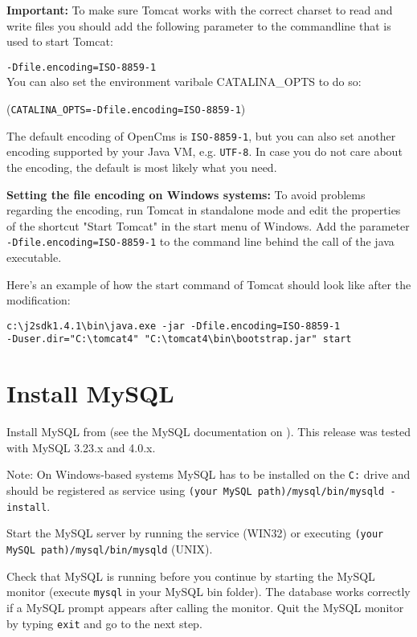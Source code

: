 \textbf{Important:} To make sure Tomcat works with the correct charset to read and
write files you should add the following parameter to the
commandline that is used to start Tomcat:

\texttt{-Dfile.encoding=ISO-8859-1}\\

You can also set the environment varibale CATALINA\_OPTS to do so:

(\texttt{CATALINA\_OPTS=-Dfile.encoding=ISO-8859-1})

The default encoding of OpenCms is \texttt{ISO-8859-1}, 
but you can also set another encoding supported by your Java VM, e.g. \texttt{UTF-8}. 
In case you do not care about the encoding, the default is most likely what you need.

\textbf{Setting the file encoding on Windows systems:} To avoid problems regarding the encoding, 
run Tomcat in standalone mode and edit the properties of the shortcut 
"Start Tomcat" in the start menu of Windows. Add the parameter \texttt{-Dfile.encoding=ISO-8859-1} to the command line behind the call of the java executable. 

Here's an example of how the start command of Tomcat should look like after the modification: 
\begin{verbatim}
c:\j2sdk1.4.1\bin\java.exe -jar -Dfile.encoding=ISO-8859-1 
-Duser.dir="C:\tomcat4" "C:\tomcat4\bin\bootstrap.jar" start
\end{verbatim}

\section{Install MySQL}
Install MySQL from
(see the MySQL documentation on
).
This release was tested with MySQL 3.23.x and 4.0.x.

Note: On Windows-based systems MySQL has to be installed on the
\texttt{C:} drive and should be registered as service using
\texttt{(your MySQL path)/mysql/bin/mysqld -install}.

Start the MySQL server by running the service (WIN32) or executing
\texttt{(your MySQL path)/mysql/bin/mysqld} (UNIX).

Check that MySQL is running before you continue by starting the
MySQL monitor (execute \texttt{mysql} in your MySQL bin folder).
The database works correctly if a MySQL prompt appears after
calling the monitor. Quit the MySQL monitor by typing
\texttt{exit} and go to the next step.


